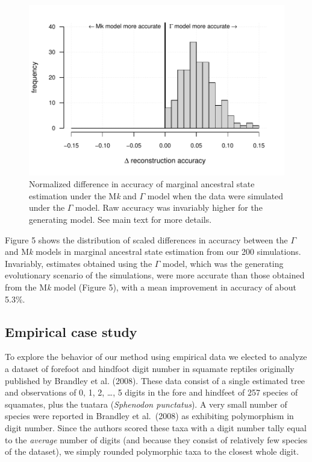 \documentclass[fleqn,10pt,lineno]{wlpeerj} %
\begin{document}
\begin{figure}
\includegraphics[width=1\linewidth]{Revell-and-Harmon.fitgammaMk.PeerJ_files/figure-latex/Revell-and-Harmon-fig5-1} \caption{Normalized difference in accuracy of marginal ancestral state estimation under the M\emph{k} and $\Gamma$ model when the data were simulated under the $\Gamma$ model. Raw accuracy was invariably higher for the generating model. See main text for more details.}\label{fig:Revell-and-Harmon-fig5}
\end{figure}

Figure 5 shows the distribution of scaled differences in accuracy between the \(\Gamma\) and M\emph{k} models in marginal ancestral state estimation from our 200 simulations. Invariably, estimates obtained using the \(\Gamma\) model, which was the generating evolutionary scenario of the simulations, were more accurate than those obtained from the M\emph{k} model (Figure 5), with a mean improvement in accuracy of about 5.3\%.

\subsection{Empirical case study}\label{empirical-case-study}

To explore the behavior of our method using empirical data we elected to analyze a dataset of forefoot and hindfoot digit number in squamate reptiles originally published by Brandley et al. (2008). These data consist of a single estimated tree and observations of 0, 1, 2, \ldots, 5 digits in the fore and hindfeet of 257 species of squamates, plus the tuatara (\emph{Sphenodon punctatus}). A very small number of species were reported in Brandley et al.~(2008) as exhibiting polymorphism in digit number. Since the authors scored these taxa with a digit number tally equal to the \emph{average} number of digits (and because they consist of relatively few species of the dataset), we simply rounded polymorphic taxa to the closest whole digit.
\end{document}
